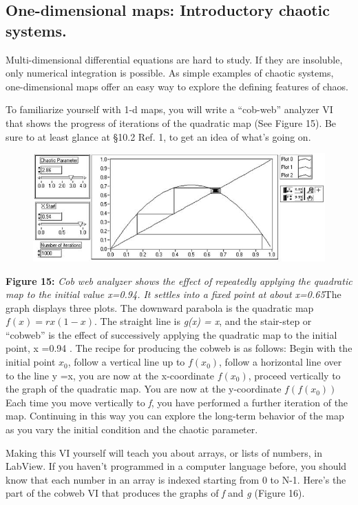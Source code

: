 \documentclass{../lab}
\begin{document}
\subsection{One-dimensional maps: Introductory chaotic systems.}

Multi-dimensional differential equations are hard to study. If they are insoluble, only numerical integration is possible. As simple examples of chaotic systems, one-dimensional maps offer an easy way to explore the defining features of chaos.

To familiarize yourself with 1-d maps, you will write a ``cob-web'' analyzer VI that shows the progress of iterations of the quadratic map (See Figure 15). Be sure to at least glance at §10.2 Ref. 1, to get an idea of what's going on.


\begin{figure}[h]
    \centering
    \href{http://experimentationlab.berkeley.edu/sites/default/files/images/Nldimage070.jpg}{\includegraphics[width=0.5\linewidth]{images/Nldimage070.jpg}}
    \caption{}
    \label{fig:Nldimage070}
\end{figure}

\textbf{Figure 15:} \emph{Cob web analyzer shows the effect of repeatedly applying the quadratic map to the initial value x=0.94. It settles into a fixed point at about x=0.65}The graph displays three plots. The downward parabola is the quadratic map $ f(x)=rx(1-x) $. The straight line is \emph{g(x) = x}, and the stair-step or ``cobweb'' is the effect of successively applying the quadratic map to the initial point, x =0.94 . The recipe for producing the cobweb is as follows: Begin with the initial point $ x_0 $, follow a vertical line up to $ f(x_0) $, follow a horizontal line over to the line y =x, you are now at the x-coordinate $ f(x_0) $, proceed vertically to the graph of the quadratic map. You are now at the y-coordinate $ f(f(x_0)) $ Each time you move vertically to \emph{f}, you have performed a further iteration of the map. Continuing in this way you can explore the long-term behavior of the map as you vary the initial condition and the chaotic parameter.

Making this VI yourself will teach you about arrays, or lists of numbers, in LabView. If you haven't programmed in a computer language before, you should know that each number in an array is indexed starting from 0 to N-1. Here's the part of the cobweb VI that produces the graphs of \emph{f} and \emph{g} (Figure 16).
\end{document}
